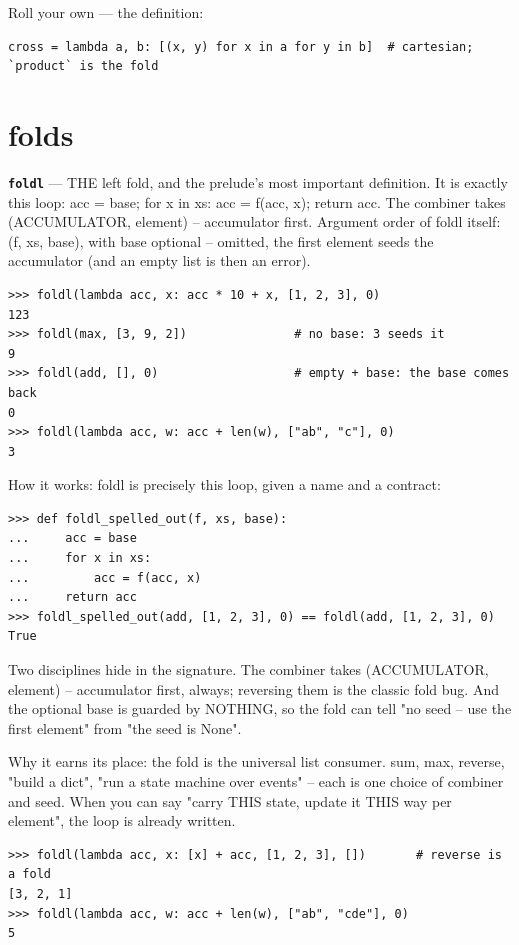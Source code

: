 \documentclass[10pt,letterpaper]{article}
\begin{document}
Roll your own --- the definition:

\begin{lstlisting}[style=ex]
cross = lambda a, b: [(x, y) for x in a for y in b]  # cartesian; `product` is the fold
\end{lstlisting}

\section{folds}
\textbf{\texttt{foldl}} --- THE left fold, and the prelude's most important definition. It is exactly this loop: acc = base; for x in xs: acc = f(acc, x); return acc. The combiner takes (ACCUMULATOR, element) -- accumulator first. Argument order of foldl itself: (f, xs, base), with base optional -- omitted, the first element seeds the accumulator (and an empty list is then an error).
\begin{lstlisting}[style=ex]
>>> foldl(lambda acc, x: acc * 10 + x, [1, 2, 3], 0)
123
>>> foldl(max, [3, 9, 2])               # no base: 3 seeds it
9
>>> foldl(add, [], 0)                   # empty + base: the base comes back
0
>>> foldl(lambda acc, w: acc + len(w), ["ab", "c"], 0)
3
\end{lstlisting}

How it works: foldl is precisely this loop, given a name and a contract:

\begin{lstlisting}[style=ex]
>>> def foldl_spelled_out(f, xs, base):
...     acc = base
...     for x in xs:
...         acc = f(acc, x)
...     return acc
>>> foldl_spelled_out(add, [1, 2, 3], 0) == foldl(add, [1, 2, 3], 0)
True
\end{lstlisting}

Two disciplines hide in the signature. The combiner takes (ACCUMULATOR, element) -- accumulator first, always; reversing them is the classic fold bug. And the optional base is guarded by NOTHING, so the fold can tell "no seed -- use the first element" from "the seed is None".


Why it earns its place: the fold is the universal list consumer. sum, max, reverse, "build a dict", "run a state machine over events" -- each is one choice of combiner and seed. When you can say "carry THIS state, update it THIS way per element", the loop is already written.

\begin{lstlisting}[style=ex]
>>> foldl(lambda acc, x: [x] + acc, [1, 2, 3], [])       # reverse is a fold
[3, 2, 1]
>>> foldl(lambda acc, w: acc + len(w), ["ab", "cde"], 0)
5
\end{lstlisting}
\end{document}
